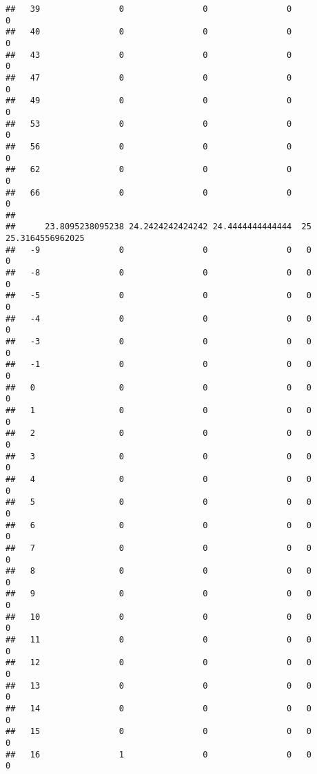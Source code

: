 \documentclass[]{article}
\begin{document}
\begin{verbatim}
##   39                0                0                0                0
##   40                0                0                0                0
##   43                0                0                0                0
##   47                0                0                0                0
##   49                0                0                0                0
##   53                0                0                0                0
##   56                0                0                0                0
##   62                0                0                0                0
##   66                0                0                0                0
##     
##      23.8095238095238 24.2424242424242 24.4444444444444  25 25.3164556962025
##   -9                0                0                0   0                0
##   -8                0                0                0   0                0
##   -5                0                0                0   0                0
##   -4                0                0                0   0                0
##   -3                0                0                0   0                0
##   -1                0                0                0   0                0
##   0                 0                0                0   0                0
##   1                 0                0                0   0                0
##   2                 0                0                0   0                0
##   3                 0                0                0   0                0
##   4                 0                0                0   0                0
##   5                 0                0                0   0                0
##   6                 0                0                0   0                0
##   7                 0                0                0   0                0
##   8                 0                0                0   0                0
##   9                 0                0                0   0                0
##   10                0                0                0   0                0
##   11                0                0                0   0                0
##   12                0                0                0   0                0
##   13                0                0                0   0                0
##   14                0                0                0   0                0
##   15                0                0                0   0                0
##   16                1                0                0   0                0

\end{verbatim}
\end{document}
